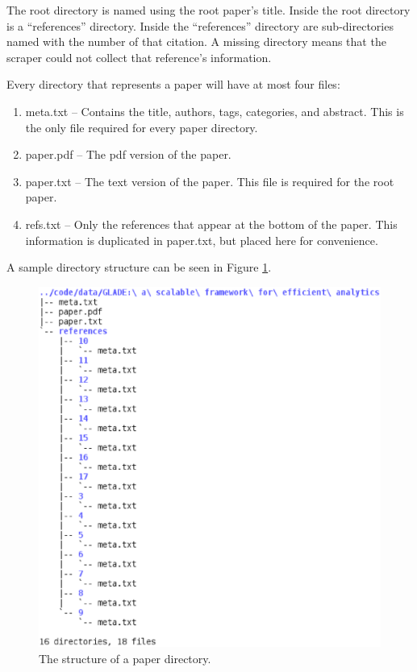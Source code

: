 \documentclass[10pt, conference, compsocconf]{IEEEtran}
\begin{document}
The root directory is named using the root paper's title. Inside the root directory is a ``references'' directory.
Inside the ``references'' directory are sub-directories named with the number of that citation. A missing directory
means that the scraper could not collect that reference's information.

Every directory that represents a paper will have at most four files:
\begin{enumerate}
   \item meta.txt -- Contains the title, authors, tags, categories, and abstract. This is the only file required for every paper directory.
   \item paper.pdf -- The pdf version of the paper.
   \item paper.txt -- The text version of the paper. This file is required for the root paper.
   \item refs.txt -- Only the references that appear at the bottom of the paper. This information is duplicated in paper.txt, but placed here for convenience.
\end{enumerate}

A sample directory structure can be seen in Figure \ref{fig:tree}.

\begin{figure}[ht]
   \includegraphics[width=\columnwidth px]{images/tree.eps}
        \caption{The structure of a paper directory.}
        \label{fig:tree}
\end{figure}
\end{document}
